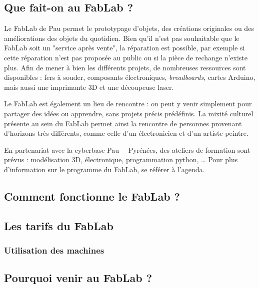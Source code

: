\subsection{Que fait-on au FabLab ?}
Le FabLab de Pau permet le prototypage d'objets, des créations originales ou des améliorations des objets du quotidien.
Bien qu'il n'est pas souhaitable que le FabLab soit un "service après vente", la réparation est possible, par exemple si cette réparation n'est pas proposée au public ou si la pièce de rechange n'existe plus.
Afin de mener à bien les différents projets, de nombreuses ressources sont disponibles : fers à souder, composants électroniques, \textit{breadboards}, cartes Arduino, mais aussi une imprimante 3D et une découpeuse laser.

Le FabLab est également un lieu de rencontre : on peut y venir simplement pour partager des idées ou apprendre, sans projets précis prédéfinis. La mixité culturel présente au sein du FabLab permet ainsi la rencontre de personnes provenant d'horizons très différents, comme celle d'un électronicien et d'un artiste peintre.

En partenariat avec la cyberbase Pau~-~Pyrénées, des ateliers de formation sont prévus : modélisation 3D, électronique, programmation python, \dots
Pour plus d'information sur le programme du FabLab, se référer à l'agenda.

\subsection{Comment fonctionne le FabLab ?}

\subsection{Les tarifs du FabLab}

\subsubsection{Utilisation des machines}

\subsection{Pourquoi venir au FabLab ?}
